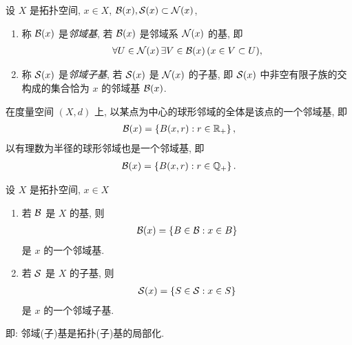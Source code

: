     \begin{Definition}[邻域基与邻域子基]
        设 $ X $ 是拓扑空间, $ x\in X $, $ \mathcal{B}(x), \mathcal{S}(x)\subset \mathcal{N}(x) $,
        \begin{enumerate}
            \item 称 $ \mathcal{B}(x) $ 是\emph{邻域基}, 若 $ \mathcal{B}(x) $ 是邻域系 $ \mathcal{N}(x) $ 的基, 即
            \begin{align*}
                \forall U\in\mathcal{N}(x)\,\exists V\in\mathcal{B}(x)\,(x\in V\subset U),
            \end{align*}
            \item 称 $ \mathcal{S}(x) $ 是\emph{邻域子基}, 若 $ \mathcal{S}(x) $ 是 $ \mathcal{N}(x) $ 的子基, 即 $ \mathcal{S}(x) $ 中非空有限子族的交构成的集合恰为 $ x $ 的邻域基 $ \mathcal{B}(x) $.
        \end{enumerate}
    \end{Definition}

    \begin{Example}
        在度量空间 $ (X, d) $ 上, 以某点为中心的球形邻域的全体是该点的一个邻域基, 即
        \begin{align*}
            \mathcal{B}(x)=\left\{ B(x, r): r\in\mathbb{R}_{+} \right\},
        \end{align*}
        以有理数为半径的球形邻域也是一个邻域基, 即
        \begin{align*}
            \mathcal{B}(x)=\left\{ B(x, r): r\in\mathbb{Q}_{+} \right\}.
        \end{align*}
    \end{Example}
    
    \begin{Theorem}[基与子基产生的邻域基与邻域子基的刻画]
        设 $ X $ 是拓扑空间, $ x\in X $
        \begin{enumerate}
            \item 若 $ \mathcal{B} $ 是 $ X $ 的基, 则
            \begin{align*}
                \mathcal{B}(x)=\left\{ B\in\mathcal{B}: x\in B \right\}
            \end{align*}
            是 $ x $ 的一个邻域基. 
            \item 若 $ \mathcal{S} $ 是 $ X $ 的子基, 则
            \begin{align*}
                \mathcal{S}(x)=\left\{ S\in \mathcal{S}: x\in S \right\}
            \end{align*}
            是 $ x $ 的一个邻域子基. 
        \end{enumerate}
        
        即: 邻域(子)基是拓扑(子)基的局部化.
    \end{Theorem}
